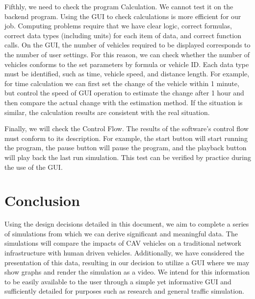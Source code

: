 \documentclass[onecolumn, draftclsnofoot,10pt, compsoc]{IEEEtran}
\begin{document}
Fifthly, we need to check the program Calculation.
We cannot test it on the backend program.
Using the GUI to check calculations is more efficient for our job.
Computing problems require that we have clear logic, correct formulas, correct data types (including units) for each item of data, and correct function calls.
On the GUI, the number of vehicles required to be displayed corresponds to the number of user settings.
For this reason, we can check whether the number of vehicles conforms to the set parameters by formula or vehicle ID.
Each data type must be identified, such as time, vehicle speed, and distance length.
For example, for time calculation we can first set the change of the vehicle within 1 minute, but control the speed of GUI operation to estimate the change after 1 hour and then compare the actual change with the estimation method.
If the situation is similar, the calculation results are consistent with the real situation.

Finally, we will check the Control Flow.
The results of the software's control flow must conform to its description.
For example, the start button will start running the program, the pause button will pause the program, and the playback button will play back the last run simulation.
This test can be verified by practice during the use of the GUI.
\section{Conclusion}
Using the design decisions detailed in this document, we aim to complete a series of simulations from which we can derive significant and meaningful data.
The simulations will compare the impacts of CAV vehicles on a traditional network infrastructure with human driven vehicles.
Additionally, we have considered the presentation of this data, resulting in our decision to utilize a GUI where we may show graphs and render the simulation as a video.
We intend for this information to be easily available to the user through a simple yet informative GUI and sufficiently detailed for purposes such as research and general traffic simulation.
\end{document}
